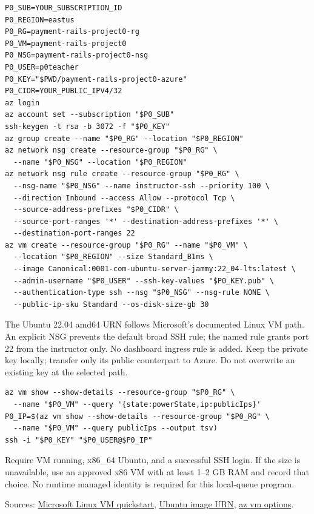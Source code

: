 \documentclass[10pt,letterpaper]{article}
\newcommand{\smalltitle}[1]{\par\vspace{5pt}{\color{navy}\large\bfseries #1}\par\vspace{2pt}}
\begin{document}
\begin{lstlisting}
P0_SUB=YOUR_SUBSCRIPTION_ID
P0_REGION=eastus
P0_RG=payment-rails-project0-rg
P0_VM=payment-rails-project0
P0_NSG=payment-rails-project0-nsg
P0_USER=p0teacher
P0_KEY="$PWD/payment-rails-project0-azure"
P0_CIDR=YOUR_PUBLIC_IPV4/32
az login
az account set --subscription "$P0_SUB"
ssh-keygen -t rsa -b 3072 -f "$P0_KEY"
az group create --name "$P0_RG" --location "$P0_REGION"
az network nsg create --resource-group "$P0_RG" \
  --name "$P0_NSG" --location "$P0_REGION"
az network nsg rule create --resource-group "$P0_RG" \
  --nsg-name "$P0_NSG" --name instructor-ssh --priority 100 \
  --direction Inbound --access Allow --protocol Tcp \
  --source-address-prefixes "$P0_CIDR" \
  --source-port-ranges '*' --destination-address-prefixes '*' \
  --destination-port-ranges 22
az vm create --resource-group "$P0_RG" --name "$P0_VM" \
  --location "$P0_REGION" --size Standard_B1ms \
  --image Canonical:0001-com-ubuntu-server-jammy:22_04-lts:latest \
  --admin-username "$P0_USER" --ssh-key-values "$P0_KEY.pub" \
  --authentication-type ssh --nsg "$P0_NSG" --nsg-rule NONE \
  --public-ip-sku Standard --os-disk-size-gb 30
\end{lstlisting}
The Ubuntu 22.04 amd64 URN follows Microsoft's documented Linux VM path. An explicit NSG prevents the default broad SSH rule; the named rule grants port 22 from the instructor only. No dashboard ingress rule is added. Keep the private key locally; transfer only its public counterpart to Azure. Do not overwrite an existing key at the selected path.

\smalltitle{Provisioning gate}
\begin{lstlisting}
az vm show --show-details --resource-group "$P0_RG" \
  --name "$P0_VM" --query '{state:powerState,ip:publicIps}'
P0_IP=$(az vm show --show-details --resource-group "$P0_RG" \
  --name "$P0_VM" --query publicIps --output tsv)
ssh -i "$P0_KEY" "$P0_USER@$P0_IP"
\end{lstlisting}
Require VM running, x86\_64 Ubuntu, and a successful SSH login. If the size is unavailable, use an approved x86 VM with at least 1--2 GB RAM and record that choice. No runtime managed identity is required for this local-queue program.

Sources: \href{https://learn.microsoft.com/en-us/azure/virtual-machines/linux/quick-create-cli}{Microsoft Linux VM quickstart}, \href{https://learn.microsoft.com/en-us/azure/virtual-machines/linux/tutorial-manage-vm}{Ubuntu image URN}, \href{https://learn.microsoft.com/en-us/cli/azure/vm?view=azure-cli-latest}{az vm options}.
\end{document}
